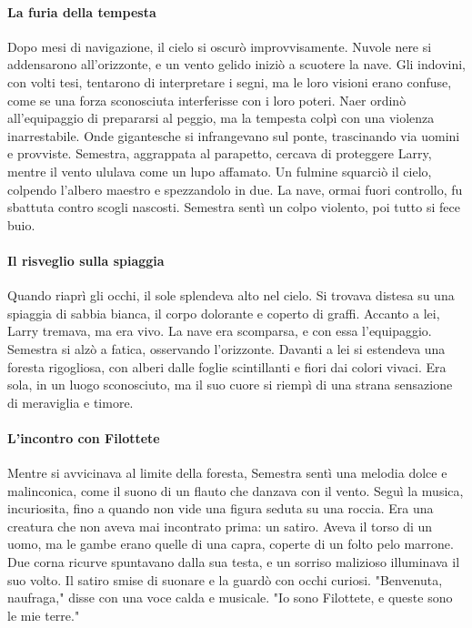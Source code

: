 \documentclass[letterpaper,twocolumn,openany,nodeprecatedcode]{dndbook}
\begin{document}
\paragraph{La furia della tempesta}  
Dopo mesi di navigazione, il cielo si oscurò improvvisamente. Nuvole nere si addensarono all’orizzonte, e un vento gelido iniziò a scuotere la nave. Gli indovini, con volti tesi, tentarono di interpretare i segni, ma le loro visioni erano confuse, come se una forza sconosciuta interferisse con i loro poteri. Naer ordinò all’equipaggio di prepararsi al peggio, ma la tempesta colpì con una violenza inarrestabile. Onde gigantesche si infrangevano sul ponte, trascinando via uomini e provviste. Semestra, aggrappata al parapetto, cercava di proteggere Larry, mentre il vento ululava come un lupo affamato. Un fulmine squarciò il cielo, colpendo l’albero maestro e spezzandolo in due. La nave, ormai fuori controllo, fu sbattuta contro scogli nascosti. Semestra sentì un colpo violento, poi tutto si fece buio.

\paragraph{Il risveglio sulla spiaggia}  
Quando riaprì gli occhi, il sole splendeva alto nel cielo. Si trovava distesa su una spiaggia di sabbia bianca, il corpo dolorante e coperto di graffi. Accanto a lei, Larry tremava, ma era vivo. La nave era scomparsa, e con essa l’equipaggio. Semestra si alzò a fatica, osservando l’orizzonte. Davanti a lei si estendeva una foresta rigogliosa, con alberi dalle foglie scintillanti e fiori dai colori vivaci. Era sola, in un luogo sconosciuto, ma il suo cuore si riempì di una strana sensazione di meraviglia e timore.

\paragraph{L’incontro con Filottete}  
Mentre si avvicinava al limite della foresta, Semestra sentì una melodia dolce e malinconica, come il suono di un flauto che danzava con il vento. Seguì la musica, incuriosita, fino a quando non vide una figura seduta su una roccia. Era una creatura che non aveva mai incontrato prima: un satiro. Aveva il torso di un uomo, ma le gambe erano quelle di una capra, coperte di un folto pelo marrone. Due corna ricurve spuntavano dalla sua testa, e un sorriso malizioso illuminava il suo volto. Il satiro smise di suonare e la guardò con occhi curiosi. "Benvenuta, naufraga," disse con una voce calda e musicale. "Io sono Filottete, e queste sono le mie terre."
\end{document}
